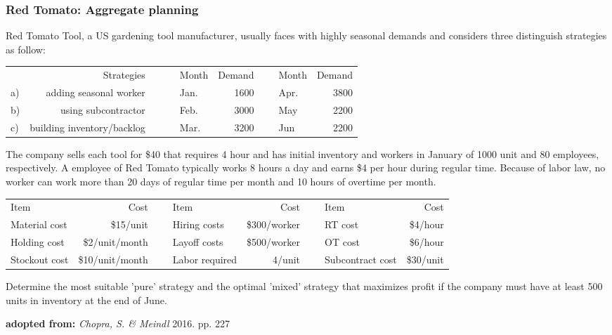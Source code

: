 \documentclass[10pt,handout,notes=show]{beamer}
\begin{document}
\begin{frame}
  \frametitle{Red Tomato: Aggregate planning}

  \small{
    Red Tomato Tool, a US gardening tool manufacturer, usually faces with highly seasonal demands and considers three distinguish strategies as follow: \\
    \begin{center} \scriptsize{
    \begin{tabular}{lrclrclr} \cline{1-2} \cline{4-8}
        & Strategies              &~~~ & Month & Demand &~& Month & Demand   \\ \cline{1-2} \cline{4-8}
      a)& adding seasonal worker  &    &Jan.  & 1600    & & Apr.  & 3800    \\
      b)& using subcontractor     &    &Feb.  & 3000    & & May   & 2200   \\
      c)& building inventory/backlog&  &Mar.  & 3200    & & Jun   & 2200   \\  \cline{1-2} \cline{4-8}
    \end{tabular} }
    \end{center}

    The company sells each tool for \$40 that requires 4 hour and has initial inventory and workers in January of 1000 unit and 80 employees, respectively. A employee of Red Tomato typically works 8 hours a day and earns \$4 per hour during regular time.  Because of labor law, no worker can work more than 20 days of regular time per month and 10 hours of overtime per month.

    \begin{center} \scriptsize{
    \begin{tabular}{lrclrclr} \cline{1-2} \cline{4-5} \cline{7-8}
      Item          & Cost          & ~ & Item        & Cost         & ~ & Item              & Cost\\ \cline{1-2} \cline{4-5} \cline{7-8}
      Material cost & \$15/unit     &   & Hiring costs& \$300/worker &   & RT cost & \$4/hour \\
      Holding cost  & \$2/unit/month&   & Layoff costs& \$500/worker &   & OT cost& \$6/hour \\
      Stockout cost & \$10/unit/month&   & Labor required& 4/unit     &   & Subcontract cost& \$30/unit \\ \cline{1-2} \cline{4-5} \cline{7-8}
    \end{tabular} }
    \end{center}
    Determine the most suitable 'pure' strategy and the optimal 'mixed' strategy that maximizes profit if the company must have at least 500 units in inventory at the end of June.
  }
  \begin{flushright}
    \tiny{\textbf{adopted from:}  \textsl{Chopra, S. \& Meindl} 2016. pp. 227 }
  \end{flushright}


\end{frame}
\end{document}
